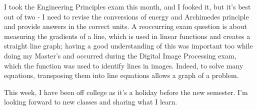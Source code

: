 \documentclass{article}
\begin{document}
I took the Engineering Principles exam this month, and I fooked it, but it's best out of two - I need to revise the conversions of energy and Archimedes principle and provide answers in the correct units. A reoccurring exam question is about measuring the gradients of a line, which is used in linear functions and creates a straight line graph; having a good understanding of this was important too while doing my Master's and occurred during the Digital Image Processing exam, which the function was used to identify lines in images. Indeed, to solve many equations, transposing them into line equations allows a graph of a problem.

This week, I have been off college as it's a holiday before the new semester. I'm looking forward to new classes and sharing what I learn.


\newpage

 
\end{document}
